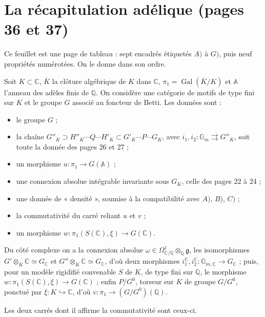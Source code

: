 \documentclass[11pt,a4paper]{article}
\begin{document}
\section*{La récapitulation adélique (pages 36 et 37)}

Ce feuillet est une page de tableau : sept encadrés étiquetés $A)$ à $G)$, puis
neuf propriétés numérotées. On le donne dans son ordre.

Soit $K \subset \mathbb{C}$, $\overline{K}$ la clôture algébrique de $K$ dans
$\mathbb{C}$, $\pi_{1} = \operatorname{Gal}(\overline{K}/K)$ et $\mathbb{A}$
l'anneau des adèles finis de $\mathbb{Q}$. On considère une catégorie de motifs
de type fini sur $K$ et le groupe $G$ associé au foncteur de Betti. Les données
sont :

\begin{itemize}
  \item[$A)$] le groupe $G$ ;
  \item[$B)$] la chaîne $G''_{K} \supset H''_{K} \cdots Q \cdots H'_{K} \subset
  G'_{K} \cdots P \cdots G_{K}$, avec $i_{1}, i_{2} : \mathbb{G}_{m}
  \rightrightarrows G''_{K}$, soit toute la donnée des pages 26 et 27 ;
  \item[$C)$] un morphisme $u : \pi_{1} \to G(\mathbb{A})$ ;
  \item[$D)$] une connexion absolue intégrable invariante sous $G_{K}$,
  celle des pages 22 à 24 ;
  \item[$E)$] une donnée de « densité », soumise à la compatibilité avec $A)$,
  $B)$, $C)$ ;
  \item[$F)$] la commutativité du carré reliant $u$ et $v$ ;
  \item[$G)$] un morphisme $w : \pi_{1}(S(\mathbb{C}), \xi) \to G(\mathbb{C})$.
\end{itemize}

Du côté complexe on a la connexion absolue $\omega \in
\Omega^{1}_{\mathbb{C}/\mathbb{Q}} \otimes_{\mathbb{Q}} \mathfrak{g}$, les
isomorphismes $G' \otimes_{K} \mathbb{C} \simeq G_{\mathbb{C}}$ et
$G'' \otimes_{K} \mathbb{C} \simeq G_{\mathbb{C}}$, d'où deux morphismes
$i^{\mathbb{C}}_{1}, i^{\mathbb{C}}_{2} : \mathbb{G}_{m,\mathbb{C}} \to
G_{\mathbb{C}}$ ; puis, pour un modèle rigidifié convenable $S$ de $K$, de type
fini sur $\mathbb{Q}$, le morphisme $w : \pi_{1}(S(\mathbb{C}), \xi) \to
G(\mathbb{C})$ ; enfin $P/G^{0}$, torseur sur $K$ de groupe $G/G^{0}$, ponctué
par $\xi : K \hookrightarrow \mathbb{C}$, d'où
$v : \pi_{1} \to (G/G^{0})(\mathbb{Q})$.

Les deux carrés dont il affirme la commutativité sont ceux-ci.
\end{document}
